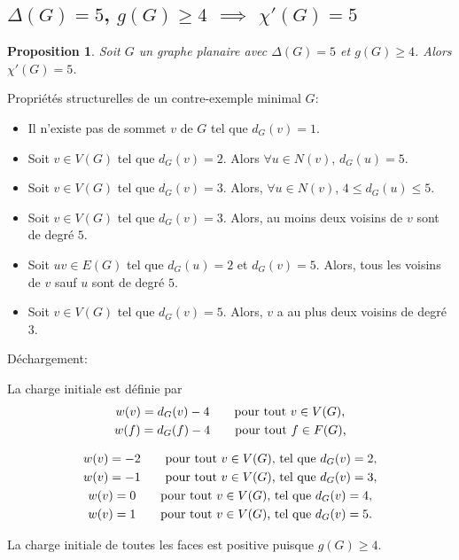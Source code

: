 \documentclass{beamer}
\newtheorem{proposition}{Proposition}
\begin{document}
\subsection{$\Delta(G)=5$, $g(G)\geq 4$ $\implies$ $\chi'(G)=5$}
\begin{frame}
\begin{proposition}
Soit $G$ un graphe planaire avec $\Delta(G) = 5$ et $g(G) \geq 4$. Alors $\chi'(G)=5$.
\end{proposition}

\end{frame}
\begin{frame}
Propriétés structurelles de un contre-exemple minimal $G$:
\begin{itemize}
\item Il n'existe pas de sommet $v$ de $G$ tel que $d_G(v) = 1$.
\item Soit $v \in V(G)$ tel que $d_G(v) = 2$. Alors $\forall u \in N(v)$, $d_G(u) = 5$.
\item Soit $v\in V(G)$ tel que $d_G(v) = 3$. Alors, $\forall u \in N(v)$, $4\le d_G(u) \le 5$.
\item Soit $v\in V(G)$ tel que $d_G(v) = 3$. Alors, au moins deux voisins de $v$ sont de degré $5$.
\item Soit $uv \in E(G)$ tel que $d_G(u) = 2$ et $d_G(v) = 5$. Alors, tous les voisins de $v$ sauf $u$ sont de degré $5$. 
\item Soit $v \in V(G)$ tel que $d_G(v) = 5$. Alors, $v$ a au plus deux voisins de degré $3$.
\end{itemize}
\end{frame}

\begin{frame}
Déchargement:

La charge initiale est définie par
 $$
\gathered
w(v) = d_G(v) - 4 \qquad \textrm{pour tout $v\in V(G)$,} \\
w(f) = d_G(f) - 4 \qquad \textrm{pour tout $f\in F(G)$,} 
\endgathered 
$$

$$ 
\gathered
w(v) = -2 \qquad \textrm{pour tout $v \in V(G)$, tel que } d_G(v) = 2, \\
w(v) = -1 \qquad \textrm{pour tout $v \in V(G)$, tel que } d_G(v) = 3, \\
w(v) =  0 \qquad \textrm{pour tout $v \in V(G)$, tel que } d_G(v) = 4, \\
w(v) =  1 \qquad \textrm{pour tout $v \in V(G)$, tel que } d_G(v) = 5.
\endgathered
$$

La charge initiale de toutes les faces est positive puisque $g(G)\ge 4$.
\end{frame}
\end{document}
